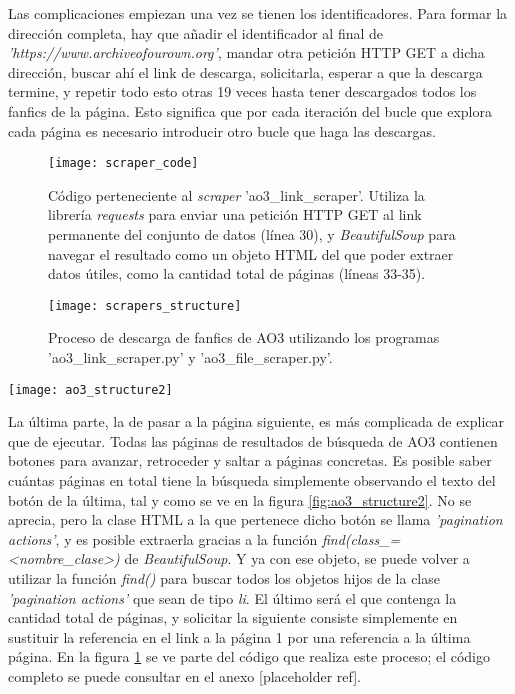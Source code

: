 \documentclass{pre-tfg}
\newcommand{\refToLinkScraperCode}{[placeholder ref]}
\begin{document}
Las complicaciones empiezan una vez se tienen los identificadores. Para formar la dirección completa, hay que añadir el identificador al final de \textit{'https://www.archiveofourown.org'}, mandar otra petición HTTP GET a dicha dirección, buscar ahí el link de descarga, solicitarla, esperar a que la descarga termine, y repetir todo esto otras 19 veces hasta tener descargados todos los fanfics de la página. Esto significa que por cada iteración del bucle que explora cada página es necesario introducir otro bucle que haga las descargas.

\begin{figure}
	\texttt{[image: scraper\_code]}
	\caption{Código perteneciente al \textit{scraper} 'ao3\_link\_scraper'. Utiliza la librería \textit{requests} para enviar una petición HTTP GET al link permanente del conjunto de datos (línea 30), y \textit{BeautifulSoup} para navegar el resultado como un objeto HTML del que poder extraer datos útiles, como la cantidad total de páginas (líneas 33-35).}
	\label{code:scraper1}
	\centering
\end{figure}

\begin{figure}
	\texttt{[image: scrapers\_structure]}
	\caption{Proceso de descarga de fanfics de AO3 utilizando los programas 'ao3\_link\_scraper.py' y 'ao3\_file\_scraper.py'.}
	\label{fig:scrapers_structure}
	\centering
\end{figure}


\begin{SCfigure}
	\caption{Navegación de páginas de búsqueda de AO3. Todos los botones vienen con su número de página, y se puede ver cuál es la última}
	\label{fig:ao3_structure2}
	\texttt{[image: ao3\_structure2]}
\end{SCfigure}

La última parte, la de pasar a la página siguiente, es más complicada de explicar que de ejecutar. Todas las páginas de resultados de búsqueda de AO3 contienen botones para avanzar, retroceder y saltar a páginas concretas. Es posible saber cuántas páginas en total tiene la búsqueda simplemente observando el texto del botón de la última, tal y como se ve en la figura \ref{fig:ao3_structure2}. No se aprecia, pero la clase HTML a la que pertenece dicho botón se llama \textit{'pagination actions'}, y es posible extraerla gracias a la función \textit{find(class\_=<nombre\_clase>)} de \textit{BeautifulSoup}. Y ya con ese objeto, se puede volver a utilizar la función \textit{find()} para buscar todos los objetos hijos de la clase \textit{'pagination actions'} que sean de tipo \textit{li}. El último será el que contenga la cantidad total de páginas, y solicitar la siguiente consiste simplemente en sustituir la referencia en el link a la página 1 por una referencia a la última página. En la figura \ref{code:scraper1} se ve parte del código que realiza este proceso; el código completo se puede consultar en el anexo \refToLinkScraperCode.
\end{document}

